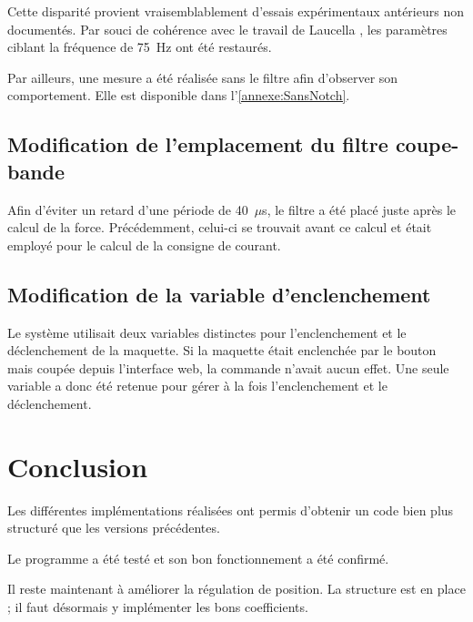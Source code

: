 Cette disparité provient vraisemblablement d'essais expérimentaux antérieurs non documentés. Par souci de cohérence avec le travail de Laucella \cite{Laucella}, les paramètres ciblant la fréquence de 75~Hz ont été restaurés.

Par ailleurs, une mesure a été réalisée sans le filtre afin d'observer son comportement. Elle est disponible dans l'\autoref{annexe:SansNotch}.

\subsection{Modification de l'emplacement du filtre coupe-bande}
Afin d'éviter un retard d'une période de 40~$\mu$s, le filtre a été placé juste après le calcul de la force. Précédemment, celui-ci se trouvait avant ce calcul et était employé pour le calcul de la consigne de courant.

\subsection{Modification de la variable d'enclenchement}
Le système utilisait deux variables distinctes pour l'enclenchement et le déclenchement de la maquette. Si la maquette était enclenchée par le bouton mais coupée depuis l'interface web, la commande n'avait aucun effet. Une seule variable a donc été retenue pour gérer à la fois l'enclenchement et le déclenchement.

\section{Conclusion}
Les différentes implémentations réalisées ont permis d'obtenir un code bien plus structuré que les versions précédentes.

Le programme a été testé et son bon fonctionnement a été confirmé.

Il reste maintenant à améliorer la régulation de position. La structure est en place ; il faut désormais y implémenter les bons coefficients.
